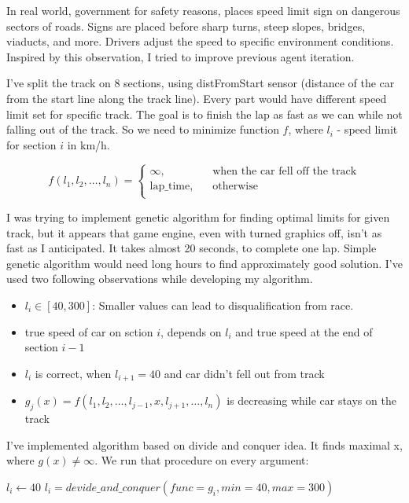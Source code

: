 \documentclass[declaration,shortabstract,english,inz]{iithesis}
\begin{document}
In real world, government for safety reasons, places speed limit sign on dangerous sectors of roads. Signs are placed before sharp turns, steep slopes, bridges, viaducts, and more. Drivers adjust the speed to specific environment conditions. Inspired by this observation, I tried to improve previous agent iteration. 

I've split the track on 8 sections, using distFromStart sensor (distance of the car from the start line along the track line). Every part would have different speed limit set for specific track. The goal is to finish the lap as fast as we can while not falling out of the track. So we need to minimize function $f$, where $l_i$ - speed limit for section $i$ in km/h.

$$ f(l_1, l_2, \dots, l_n ) =  \begin{cases}
    \infty, &\quad \text{when the car fell off the track}\\
    \text{lap\_time}, &\quad \text{otherwise} \\
  \end{cases}
 $$

I was trying to implement genetic algorithm for finding optimal limits for given track, but it appears that game engine, even with turned graphics off, isn't as fast as I anticipated. It takes almost 20 seconds, to complete one lap. Simple genetic algorithm would need long hours to find approximately good solution. I've used two following observations while developing my algorithm.

\begin{itemize}
    \item  $l_i \in [40, 300]$:  Smaller values can lead to disqualification from race.
    \item  true speed of car on sction $i$, depends on $l_i$ and true speed at the end of section $i-1$
    \item
    $l_i$ is correct, when $l_{i+1} = 40$ and car didn't fell out from track
    \item  $g_j(x) = f(l_1,l_2, \dots,l_{j-1}, x, l_{j+1}, \dots, l_n)$ is decreasing while car stays on the track
    
\end{itemize}


I've implemented algorithm based on divide and conquer idea. It finds maximal x, where $g(x) \neq \infty$. We run that procedure on every argument:

\begin{algorithmic}
    \STATE $l_i\gets 40$
        \STATE $l_i = devide\_and\_conquer(func=g_i, min=40, max=300)$
    \ENDFOR
\end{algorithmic}
\end{document}
